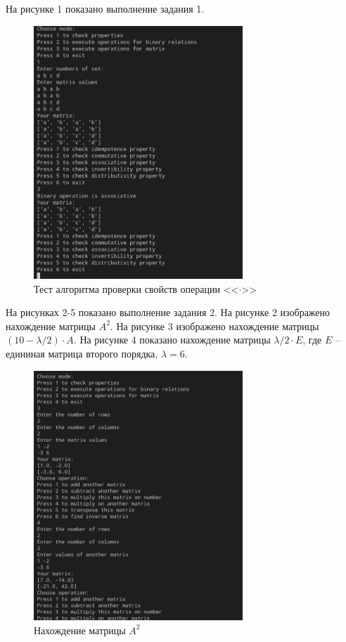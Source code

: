 \documentclass[bachelor, och, labwork]{shiza}
\begin{document}
        На рисунке 1 показано выполнение задания 1.
        \begin{figure}[H]
            \centering
            \includegraphics[width=0.7\textwidth]{photo/1.png}
            \caption{Тест алгоритма проверки свойств операции <<$\cdot$>>}
        \end{figure}

        На рисунках 2-5 показано выполнение задания 2.
        На рисунке 2 изображено нахождение матрицы $A^2$. На рисунке 3 изображено нахождение матрицы $(10 - \lambda / 2) \cdot A$.
        На рисунке 4 показано нахождение матрицы $\lambda / 2 \cdot E$, где $E$ -- едининая матрица второго порядка, $\lambda = 6$.
        \begin{figure}[H]
            \centering
            \includegraphics[width=0.7\textwidth]{photo/2.png}
            \caption{Нахождение матрицы $A^2$}
        \end{figure}
\end{document}
